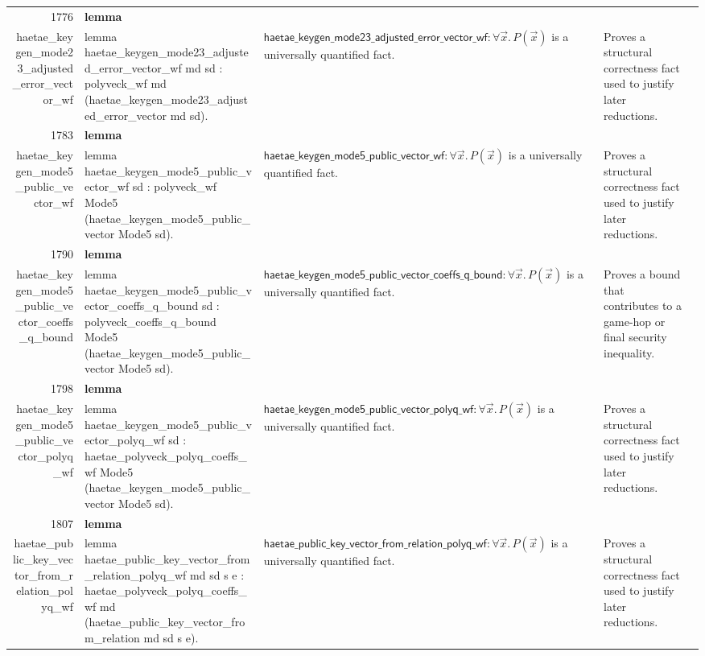 \documentclass[10pt]{article}
\newcommand{\ec}[1]{\begingroup\ttfamily\scriptsize #1\endgroup}
\begin{document}
\begin{longtable}{r L{0.17\textwidth} L{0.26\textwidth} L{0.27\textwidth} L{0.20\textwidth}}
1776 & \textbf{lemma}\\\ec{haetae\_keygen\_mode23\_adjusted\_error\_vector\_wf} & \ec{lemma haetae\_keygen\_mode23\_adjusted\_error\_vector\_wf md sd : polyveck\_wf md (haetae\_keygen\_mode23\_adjusted\_error\_vector md sd).} & \(\mathsf{haetae\_keygen\_mode23\_adjusted\_error\_vector\_wf} : \forall \vec{x}.\, P(\vec{x})\) is a universally quantified fact. & Proves a structural correctness fact used to justify later reductions. \\
1783 & \textbf{lemma}\\\ec{haetae\_keygen\_mode5\_public\_vector\_wf} & \ec{lemma haetae\_keygen\_mode5\_public\_vector\_wf sd : polyveck\_wf Mode5 (haetae\_keygen\_mode5\_public\_vector Mode5 sd).} & \(\mathsf{haetae\_keygen\_mode5\_public\_vector\_wf} : \forall \vec{x}.\, P(\vec{x})\) is a universally quantified fact. & Proves a structural correctness fact used to justify later reductions. \\
1790 & \textbf{lemma}\\\ec{haetae\_keygen\_mode5\_public\_vector\_coeffs\_q\_bound} & \ec{lemma haetae\_keygen\_mode5\_public\_vector\_coeffs\_q\_bound sd : polyveck\_coeffs\_q\_bound Mode5 (haetae\_keygen\_mode5\_public\_vector Mode5 sd).} & \(\mathsf{haetae\_keygen\_mode5\_public\_vector\_coeffs\_q\_bound} : \forall \vec{x}.\, P(\vec{x})\) is a universally quantified fact. & Proves a bound that contributes to a game-hop or final security inequality. \\
1798 & \textbf{lemma}\\\ec{haetae\_keygen\_mode5\_public\_vector\_polyq\_wf} & \ec{lemma haetae\_keygen\_mode5\_public\_vector\_polyq\_wf sd : haetae\_polyveck\_polyq\_coeffs\_wf Mode5 (haetae\_keygen\_mode5\_public\_vector Mode5 sd).} & \(\mathsf{haetae\_keygen\_mode5\_public\_vector\_polyq\_wf} : \forall \vec{x}.\, P(\vec{x})\) is a universally quantified fact. & Proves a structural correctness fact used to justify later reductions. \\
1807 & \textbf{lemma}\\\ec{haetae\_public\_key\_vector\_from\_relation\_polyq\_wf} & \ec{lemma haetae\_public\_key\_vector\_from\_relation\_polyq\_wf md sd s e : haetae\_polyveck\_polyq\_coeffs\_wf md (haetae\_public\_key\_vector\_from\_relation md sd s e).} & \(\mathsf{haetae\_public\_key\_vector\_from\_relation\_polyq\_wf} : \forall \vec{x}.\, P(\vec{x})\) is a universally quantified fact. & Proves a structural correctness fact used to justify later reductions. \\

\end{longtable}
\end{document}
